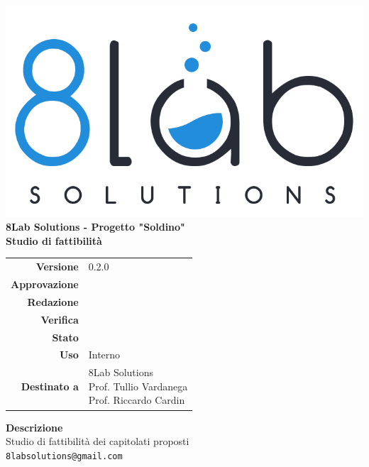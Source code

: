 \thispagestyle{empty}
\begin{titlepage}
	\begin{center}
		\includegraphics[scale = 0.3]{images/logo8_crop.png}\\
		\large \textbf{8Lab Solutions - Progetto "Soldino"} \\
		\vfill
		\Huge \textbf{Studio di fattibilità}
		\vspace*{\fill}
        
        \vfill
        \large
        \begin{tabular}{r|l}
                        \textbf{Versione} & 0.2.0\\
                        \textbf{Approvazione} &\\
                        \textbf{Redazione} &\\
                        \textbf{Verifica} &\\
                        \textbf{Stato} &\\
                        \textbf{Uso} & Interno\\
                        \textbf{Destinato a} & \parbox[t]{5cm}{8Lab Solutions
                        \\Prof. Tullio Vardanega\\Prof. Riccardo Cardin}
                \end{tabular}
                \vfill
                \normalsize
                \textbf{Descrizione}\\
                Studio di fattibilità dei capitolati proposti\\
                \vfill
                \small
                \texttt{8labsolutions@gmail.com}
	\end{center}
\end{titlepage}